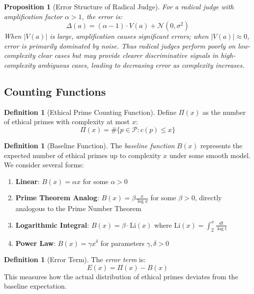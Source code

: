 \documentclass[12pt,a4paper]{article}
\newtheorem{proposition}[theorem]{Proposition}
\theoremstyle{definition}
\newtheorem{definition}[theorem]{Definition}
\theoremstyle{remark}
\begin{document}
\begin{proposition}[Error Structure of Radical Judge]
\label{prop:radical_error}
For a radical judge with amplification factor $\alpha > 1$, the error is:
\[
\Delta(a) = (\alpha - 1) \cdot V(a) + \mathcal{N}(0, \sigma^2)
\]
When $|V(a)|$ is large, amplification causes significant errors; when $|V(a)| \approx 0$, error is primarily dominated by noise. Thus radical judges perform poorly on low-complexity clear cases but may provide clearer discriminative signals in high-complexity ambiguous cases, leading to decreasing error as complexity increases.
\end{proposition}

\subsection{Counting Functions}

\begin{definition}[Ethical Prime Counting Function]
Define $\Pi(x)$ as the number of ethical primes with complexity at most $x$:
\[
\Pi(x) = \#\{p \in \mathcal{P} : c(p) \leq x\}
\]
\end{definition}

\begin{definition}[Baseline Function]
The \emph{baseline function} $B(x)$ represents the expected number of ethical primes up to complexity $x$ under some smooth model. We consider several forms:
\begin{enumerate}
    \item \textbf{Linear}: $B(x) = \alpha x$ for some $\alpha > 0$
    \item \textbf{Prime Theorem Analog}: $B(x) = \beta \frac{x}{\log x}$ for some $\beta > 0$, directly analogous to the Prime Number Theorem
    \item \textbf{Logarithmic Integral}: $B(x) = \beta \cdot \text{Li}(x)$ where $\text{Li}(x) = \int_2^x \frac{dt}{\log t}$
    \item \textbf{Power Law}: $B(x) = \gamma x^\delta$ for parameters $\gamma, \delta > 0$
\end{enumerate}
\end{definition}

\begin{definition}[Error Term]
The \emph{error term} is:
\[
E(x) = \Pi(x) - B(x)
\]
This measures how the actual distribution of ethical primes deviates from the baseline expectation.
\end{definition}
\end{document}
